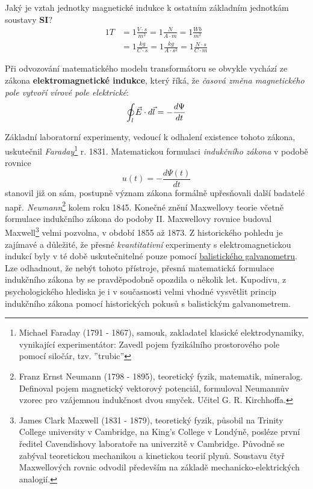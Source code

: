     \begin{note}
      Jaký je vztah jednotky magnetické indukce k ostatním základním jednotkám soustavy \textbf{SI}? 
      \begin{align*}
      1T &= 1\frac{V\cdot s}{m^2} = 1\frac{N}{A\cdot m} = 1\frac{Wb}{m^2}          \\
         &= 1\frac{kg}{C\cdot s} = 1\frac{kg}{A\cdot s^2} = 1\frac{N\cdot s}{C \cdot m}
      \end{align*}
    \end{note}
    
    Při odvozování matematického modelu transformátoru se obvykle vychází ze zákona 
    \textbf{elektromagnetické indukce}, který říká, že \emph{časová změna magnetického pole vytvoří 
    vírové pole elektrické}:
    \begin{equation}\label{es:eq_ind_z}
      \oint_l \vec{E} \cdot d\vec{l} = - \dfrac{d \Psi}{d t}
    \end{equation}
     
    Základní laboratorní experimenty, vedoucí k odhalení existence tohoto zákona, uskutečnil 
    \emph{Faraday}\footnote{Michael Faraday (1791 - 1867), samouk, zakladatel klasické 
    elektrodynamiky, vynikající experimentátor: Zavedl pojem fyzikálního prostorového pole pomocí 
    siločár, tzv. ''trubic''} r. 1831. Matematickou formulaci \emph{indukčního zákona} v podobě 
    rovnice
    \begin{equation}\label{ES:eq_zakl_elm25}
      u(t) = - \frac{d\Psi(t)}{dt}
    \end{equation} 
    stanovil již on sám, postupně význam zákona formálně upřesňovali další badatelé např.
    \emph{Neumann}\footnote{Franz Ernst Neumann (1798 - 1895), teoretický fyzik, matematik,
    mineralog. Definoval pojem magnetický vektorový potenciál, formuloval Neumannův vzorec pro
    vzájemnou indukčnost dvou smyček. Učitel G. R. Kirchhoffa.} kolem roku 1845. Konečné znění
    Maxwellovy teorie včetně formulace indukčního zákona do podoby II. Maxwellovy rovnice budoval
    Maxwell\footnote{James Clark Maxwell (1831 - 1879), teoretický fyzik, působil na Trinity
    College university v Cambridge, na King's College v Londýně, posléze první ředitel Cavendishovy
    laboratoře na univerzitě v Cambridge. Původně se zabýval teoretickou mechanikou a kinetickou
    teorií plynů. Soustavu čtyř Maxwellových rovnic odvodil především na základě
    mechanicko-elektrických analogií.} velmi pozvolna, v období 1855 až 1873. Z historického pohledu
    je zajímavé a důležité, že přesné \emph{kvantitativní} experimenty s elektromagnetickou indukcí
    byly v té době uskutečnitelné pouze pomocí
    \href{http://en.wikipedia.org/wiki/Galvanometer}{balistického galvanometru}. Lze odhadnout, že
    nebýt tohoto přístroje, přesná matematická formulace indukčního zákona by se pravděpodobně
    opozdila o několik let. Kupodivu, z psychologického hlediska je i v současnosti velmi vhodné
    vysvětlit princip indukčního zákona pomocí historických pokusů s balistickým galvanometrem.
    
